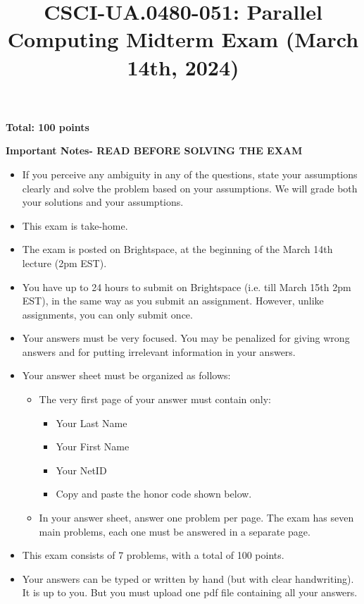 \documentclass{article}
\begin{document}
\title{CSCI-UA.0480-051: Parallel Computing Midterm Exam (March 14th, 2024)}
\date{}
\maketitle

\textbf{Total: 100 points}

\textbf{Important Notes- READ BEFORE SOLVING THE EXAM}
\begin{itemize}
    \item If you perceive any ambiguity in any of the questions, state your assumptions clearly and solve the problem based on your assumptions. We will grade both your solutions and your assumptions.
    \item This exam is take-home.
    \item The exam is posted on Brightspace, at the beginning of the March 14th lecture (2pm EST).
    \item You have up to 24 hours to submit on Brightspace (i.e. till March 15th 2pm EST), in the same way as you submit an assignment. However, unlike assignments, you can only submit once.
    \item Your answers must be very focused. You may be penalized for giving wrong answers and for putting irrelevant information in your answers.
    \item Your answer sheet must be organized as follows:
    \begin{itemize}
        \item The very first page of your answer must contain only:
        \begin{itemize}
            \item Your Last Name
            \item Your First Name
            \item Your NetID
            \item Copy and paste the honor code shown below.
        \end{itemize}
        \item In your answer sheet, answer one problem per page. The exam has seven main problems, each one must be answered in a separate page.
    \end{itemize}
    \item This exam consists of 7 problems, with a total of 100 points.
    \item Your answers can be typed or written by hand (but with clear handwriting). It is up to you. But you must upload one pdf file containing all your answers.
\end{itemize}
\end{document}
